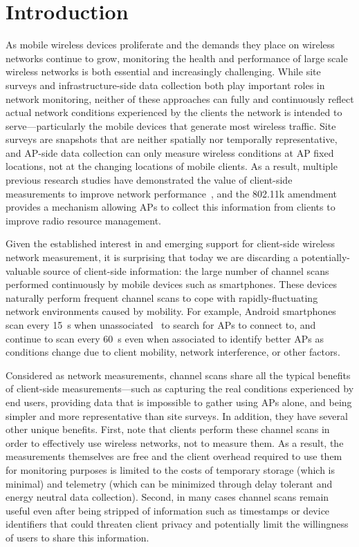 \section{Introduction}
\label{sec-introduction}

As mobile wireless devices proliferate and the demands they place on wireless
networks continue to grow, monitoring the health and performance of large
scale wireless networks is both essential and increasingly challenging. While
site surveys and infrastructure-side data collection both play important
roles in network monitoring, neither of these approaches can fully and
continuously reflect actual network conditions experienced by the clients the
network is intended to serve---particularly the mobile devices that generate
most wireless traffic. Site surveys are snapshots that are neither spatially nor
temporally representative, and AP-side data collection can only
measure wireless conditions at AP fixed locations, not at the changing
locations of mobile clients. As a result, multiple previous research studies
have demonstrated the value of client-side measurements to improve network
performance~\cite{mishra2005weighted,mishra2006client}, and the 802.11k
amendment~\cite{80211k} provides a mechanism allowing APs to collect this
information from clients to improve radio resource management.

Given the established interest in and emerging support for client-side wireless
network measurement, it is surprising that today we are discarding a
potentially-valuable source of client-side information: the large number of
channel scans performed continuously by mobile devices such as smartphones.
These devices naturally perform frequent channel scans to cope with
rapidly-fluctuating network environments caused by mobility. For example,
Android smartphones scan every 15~s when unassociated~\cite{hanover2014cutting}
to search for APs to connect to, and continue to scan every 60~s even when
associated to identify better APs as conditions change due to client mobility,
network interference, or other factors.

Considered as network measurements, channel scans share all the typical
benefits of client-side measurements---such as capturing the real conditions
experienced by end users, providing data that is impossible to gather using
APs alone, and being simpler and more representative than site surveys. In
addition, they have several other unique benefits. First, note that clients
perform these channel scans in order to effectively use wireless networks, not
to measure them. As a result, the measurements themselves are free and the
client overhead required to use them for monitoring purposes is limited to
the costs of temporary storage (which is minimal) and telemetry (which can be
minimized through delay tolerant and energy neutral data collection). Second,
in many cases channel scans remain useful even after being stripped of
information such as timestamps or device identifiers that could threaten
client privacy and potentially limit the willingness of users to share this
information.

